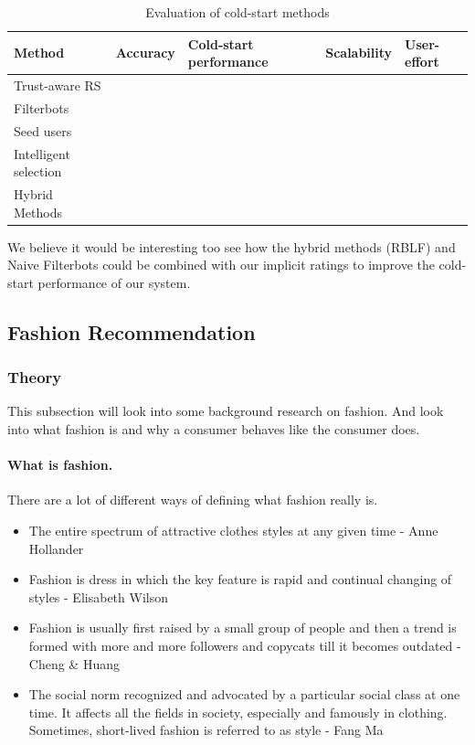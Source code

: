 \begin{table}[H]
    \centering
    \begin{tabular}{|l|l|l|l|l|}
    \hline
	Method & Accuracy & Cold-start performance & Scalability & User-effort \\ \hline
	Trust-aware RS & & & \\ \hline
	Filterbots & & & \\ \hline
	Seed users & & & \\ \hline
	Intelligent selection & & & \\ \hline
	Hybrid Methods & & & \\ \hline
    \end{tabular}
    \caption[Evaluation of cold-start methods]{Evaluation of cold-start methods}
    \label{table:evaluationcoldstart}
\end{table}

We believe it would be interesting too see how the hybrid methods (RBLF) and Naive Filterbots could be
combined with our implicit ratings to improve the cold-start performance of our system.

\subsection{Fashion Recommendation}



\subsubsection{Theory}
This subsection will look into some background research on fashion.  And look
into what fashion is and why a consumer behaves like the consumer does.

\paragraph{What is fashion.}

There are a lot of different ways of defining what fashion really is.

\begin{itemize}
    \item The entire spectrum of attractive clothes styles at any given time -
    Anne Hollander
    \item Fashion is dress in which the key feature is rapid and continual
    changing of styles - Elisabeth Wilson
    \item Fashion is usually first raised by a small group of people and then a
    trend is formed with more and more followers and copycats till it becomes
    outdated - Cheng \& Huang
    \item The social norm recognized and advocated by a particular social class
    at one time. It affects all the fields in society, especially and famously
    in clothing. Sometimes, short-lived fashion is referred to as style - Fang
    Ma \cite{Fang2012}
\end{itemize}

